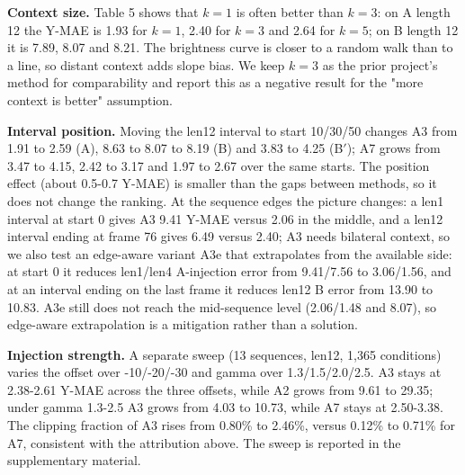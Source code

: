 \documentclass[twocolumn,10pt]{svjour3}
\begin{document}
\textbf{Context size.} Table 5 shows that $k=1$ is often better than $k=3$: on A length 12 the Y-MAE is 1.93 for $k=1$, 2.40 for $k=3$ and 2.64 for $k=5$; on B length 12 it is 7.89, 8.07 and 8.21. The brightness curve is closer to a random walk than to a line, so distant context adds slope bias. We keep $k=3$ as the prior project's method for comparability and report this as a negative result for the "more context is better" assumption.


\begin{table}[t]
\centering
\caption{Sensitivity of the offset estimator to the context window k for the offset estimator (mean over 13 sequences).}
\end{table}

\textbf{Interval position.} Moving the len12 interval to start 10/30/50 changes A3 from 1.91 to 2.59 (A), 8.63 to 8.07 to 8.19 (B) and 3.83 to 4.25 (B$'$); A7 grows from 3.47 to 4.15, 2.42 to 3.17 and 1.97 to 2.67 over the same starts. The position effect (about 0.5-0.7 Y-MAE) is smaller than the gaps between methods, so it does not change the ranking. At the sequence edges the picture changes: a len1 interval at start 0 gives A3 9.41 Y-MAE versus 2.06 in the middle, and a len12 interval ending at frame 76 gives 6.49 versus 2.40; A3 needs bilateral context, so we also test an edge-aware variant A3e that extrapolates from the available side: at start 0 it reduces len1/len4 A-injection error from 9.41/7.56 to 3.06/1.56, and at an interval ending on the last frame it reduces len12 B error from 13.90 to 10.83. A3e still does not reach the mid-sequence level (2.06/1.48 and 8.07), so edge-aware extrapolation is a mitigation rather than a solution.


\textbf{Injection strength.} A separate sweep (13 sequences, len12, 1,365 conditions) varies the offset over -10/-20/-30 and gamma over 1.3/1.5/2.0/2.5. A3 stays at 2.38-2.61 Y-MAE across the three offsets, while A2 grows from 9.61 to 29.35; under gamma 1.3-2.5 A3 grows from 4.03 to 10.73, while A7 stays at 2.50-3.38. The clipping fraction of A3 rises from 0.80\% to 2.46\%, versus 0.12\% to 0.71\% for A7, consistent with the attribution above. The sweep is reported in the supplementary material.
\end{document}
